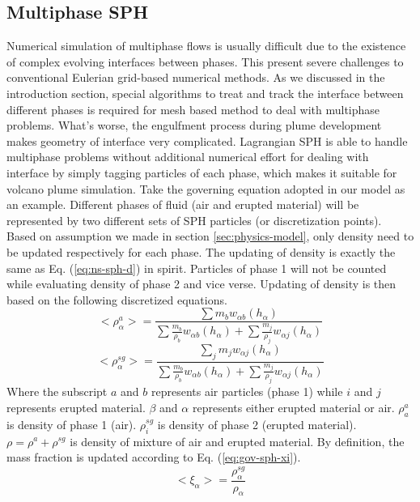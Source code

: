 \documentclass[journal abbreviation, manuscript]{copernicus}
\begin{document}
\subsection{Multiphase SPH}
Numerical simulation of multiphase flows is usually difficult due to the existence of complex evolving interfaces between phases.  This present severe challenges to conventional Eulerian grid-based numerical methods. As we discussed in the introduction section, special algorithms to treat and track the interface between different phases is required for mesh based method to deal with multiphase problems. What's worse, the engulfment process during plume development makes geometry of interface very complicated. Lagrangian SPH is able to handle multiphase problems without additional numerical effort for dealing with interface by simply tagging particles of each phase, which makes it suitable for volcano plume simulation. Take the governing equation adopted in our model as an example. Different phases of fluid (air and erupted material) will be represented by two different sets of SPH particles (or discretization points). Based on assumption we made in section \ref{sec:physics-model}, only density need to be updated respectively for each phase. The updating of density is exactly the same as Eq. (\ref{eq:ns-sph-d}) in spirit.  Particles of phase 1 will not be counted while evaluating density of phase 2 and vice verse. Updating of density is then based on the following discretized equations.
\begin{equation}
<\rho_{\alpha}^a>=\frac{\sum m_b w_{\alpha b} (h_{\alpha})}{\sum \frac{m_b}{\rho_b} w_{\alpha b} (h_{\alpha}) +\sum \frac{m_j}{\rho_j} w_{\alpha j} (h_{\alpha})} \label{eq:gov-sph-d1}
\end{equation}
\begin{equation}
<\rho_\alpha^{sg}>=\frac{\sum_j m_j w_{\alpha j} (h_\alpha)}{\sum \frac{m_b}{\rho_b} w_{\alpha b} (h_{\alpha}) +\sum \frac{m_j}{\rho_j} w_{\alpha j} (h_{\alpha})} \label{eq:gov-sph-d2}
\end{equation}
Where the subscript $a$ and $b$ represents air particles (phase 1) while $i$ and $j$ represents erupted material. $\beta$ and $\alpha$ represents either erupted material or air.
$\rho_a^a$ is density of phase 1 (air). 
 $\rho_i^{sg}$ is density of phase 2 (erupted material).
$\rho=\rho^a + \rho^{sg}$ is density of mixture of air and erupted material. By definition, the mass fraction is updated according to Eq. (\ref{eq:gov-sph-xi}).
\begin{equation}
<\xi_{\alpha}> = \dfrac{\rho^{sg}_{\alpha}}{\rho_{\alpha}}
\label{eq:gov-sph-xi}
\end{equation}
\end{document}
